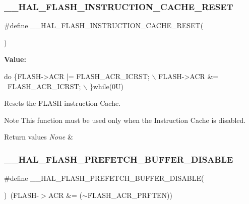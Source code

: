 \subsubsection{\texorpdfstring{\+\_\+\+\_\+\+H\+A\+L\+\_\+\+F\+L\+A\+S\+H\+\_\+\+I\+N\+S\+T\+R\+U\+C\+T\+I\+O\+N\+\_\+\+C\+A\+C\+H\+E\+\_\+\+R\+E\+S\+ET}{\_\_HAL\_FLASH\_INSTRUCTION\_CACHE\_RESET}}
{\footnotesize\ttfamily \#define \+\_\+\+\_\+\+H\+A\+L\+\_\+\+F\+L\+A\+S\+H\+\_\+\+I\+N\+S\+T\+R\+U\+C\+T\+I\+O\+N\+\_\+\+C\+A\+C\+H\+E\+\_\+\+R\+E\+S\+ET(\begin{DoxyParamCaption}{ }\end{DoxyParamCaption})}

{\bfseries Value\+:}
\begin{DoxyCode}
\textcolor{keywordflow}{do} \{FLASH->ACR |= FLASH\_ACR\_ICRST;  \(\backslash\)
                                                  FLASH->ACR &= ~FLASH\_ACR\_ICRST; \(\backslash\)
                                                 \}\textcolor{keywordflow}{while}(0U)
\end{DoxyCode}


Resets the F\+L\+A\+SH instruction Cache. 

\begin{DoxyNote}{Note}
This function must be used only when the Instruction Cache is disabled. 
\end{DoxyNote}

\begin{DoxyRetVals}{Return values}
{\em None} & \\
\hline
\end{DoxyRetVals}
\mbox{\label{group___f_l_a_s_h___exported___macros_ga646a4cb92e85659334d14a8c78f0ede8}} 
\subsubsection{\texorpdfstring{\+\_\+\+\_\+\+H\+A\+L\+\_\+\+F\+L\+A\+S\+H\+\_\+\+P\+R\+E\+F\+E\+T\+C\+H\+\_\+\+B\+U\+F\+F\+E\+R\+\_\+\+D\+I\+S\+A\+B\+LE}{\_\_HAL\_FLASH\_PREFETCH\_BUFFER\_DISABLE}}
{\footnotesize\ttfamily \#define \+\_\+\+\_\+\+H\+A\+L\+\_\+\+F\+L\+A\+S\+H\+\_\+\+P\+R\+E\+F\+E\+T\+C\+H\+\_\+\+B\+U\+F\+F\+E\+R\+\_\+\+D\+I\+S\+A\+B\+LE(\begin{DoxyParamCaption}{ }\end{DoxyParamCaption})~(F\+L\+A\+SH-\/$>$A\+CR \&= ($\sim$F\+L\+A\+S\+H\+\_\+\+A\+C\+R\+\_\+\+P\+R\+F\+T\+EN))}



